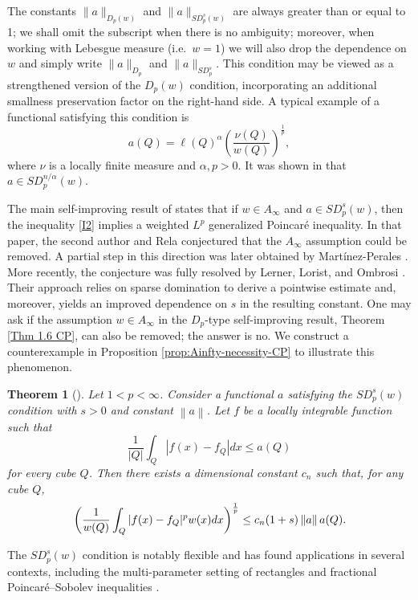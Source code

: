 \documentclass[reqno, 10pt, oneside]{amsart}
\numberwithin{equation}{section}
\newtheorem{theorem}{Theorem}
\numberwithin{theorem}{section}
\newcommand{\1}{{\rm 1\hspace*{-0.4ex}%
\rule{0.1ex}{1.52ex}\hspace*{0.2ex}}}
\begin{document}
%
The constants $\|a\|_{D_p(w)}$ and $\|a\|_{SD_p^s(w)}$ are always greater than or equal to 1; we shall omit the subscript when there is no ambiguity; moreover, when working with Lebesgue measure (i.e.\ $w=1$) we will also drop the dependence on $w$ and simply write $\|a\|_{D_p}$ and $\|a\|_{SD_p^s}$. This condition may be viewed as a strengthened version of the $D_p(w)$ condition, incorporating an additional smallness preservation factor on the right-hand side. A typical example of a functional satisfying this condition is  
\begin{equation*}
	a(Q)=\ell(Q)^\alpha \left(\frac{\nu(Q)}{w(Q)}\right)^{\frac{1}{p}},
\end{equation*}  
where $\nu$ is a locally finite measure and $\alpha, p>0$. It was shown in \cite[Lemma 3.2]{PR} that $a \in SD_p^{n/\alpha}(w)$. 
	  
The main self-improving result of \cite{PR} states that if $w\in A_\infty$ and $a\in SD^s_p(w)$, then the inequality \eqref{I2} implies a weighted $L^p$ generalized Poincaré inequality. In that paper,  the second author 
and Rela conjectured that the $A_\infty$ assumption could be removed. A partial step in this direction was later obtained by Martínez-Perales \cite{JM}. More recently, the conjecture was fully resolved by Lerner, Lorist, and Ombrosi \cite{LLO}. Their approach relies on sparse domination to derive a pointwise estimate and, moreover, yields an improved dependence on $s$ in the resulting constant.  One may ask if the assumption $w \in A_\infty$ in the $D_p$-type self-improving result, Theorem \ref{Thm 1.6 CP}, can also be removed; the answer is no. We construct a counterexample in Proposition \ref{prop:Ainfty-necessity-CP} to illustrate this phenomenon. 


\begin{theorem} [\cite{PR,LLO}] \label{Thm 5.3 LLO}
		Let $1<p<\infty$. Consider a functional $a$ satisfying the $SD^s_p(w)$ condition with $s>0$ and constant $\left\| a \right\| $. Let $f$ be a locally integrable function such that
		\begin{equation*}
			\frac{1}{|Q|} \int_Q |f(x)-f_Q|dx \le a(Q)
		\end{equation*}
		for every cube $Q$. Then there exists a dimensional constant $c_n$ such that, for any cube $Q$,
		\begin{equation}{\label{results shown in PR and LLO}}
			\left( \frac{1}{w(Q)} \int_Q |f(x)-f_Q|^{p} w(x)dx\right) ^\frac{1}{p} \le c_n (1+s) \left\| a \right\|  a(Q).
		\end{equation}
\end{theorem}
%
The $SD_p^s(w)$ condition is notably flexible and has found applications in several contexts, including the multi-parameter setting of rectangles \cite{CMPR} and fractional Poincaré--Sobolev inequalities \cite{HMPV}. 
\end{document}
